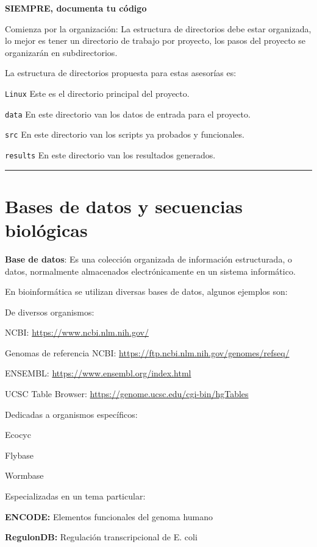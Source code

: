 \documentclass[
]{book}
\begin{document}
\textbf{SIEMPRE, documenta tu código}

Comienza por la organización: La estructura de directorios debe estar organizada, lo mejor es
tener un directorio de trabajo por proyecto, los pasos del proyecto se organizarán en
subdirectorios.

La estructura de directorios propuesta para estas asesorías es:

\texttt{Linux} Este es el directorio principal del proyecto.

\texttt{data} En este directorio van los datos de entrada para el proyecto.

\texttt{src} En este directorio van los scripts ya probados y funcionales.

\texttt{results} En este directorio van los resultados generados.

\begin{center}\rule{0.5\linewidth}{0.5pt}\end{center}

\section{Bases de datos y secuencias biológicas}\label{bases-de-datos-y-secuencias-bioluxf3gicas}

\textbf{Base de datos}: Es una colección organizada de información estructurada, o datos, normalmente
almacenados electrónicamente en un sistema informático.

En bioinformática se utilizan diversas bases de datos, algunos ejemplos son:

De diversos organismos:

NCBI: \url{https://www.ncbi.nlm.nih.gov/}

Genomas de referencia NCBI: \url{https://ftp.ncbi.nlm.nih.gov/genomes/refseq/}

ENSEMBL: \url{https://www.ensembl.org/index.html}

UCSC Table Browser: \url{https://genome.ucsc.edu/cgi-bin/hgTables}

Dedicadas a organismos específicos:

Ecocyc

Flybase

Wormbase

Especializadas en un tema particular:

\textbf{ENCODE:} Elementos funcionales del genoma humano

\textbf{RegulonDB:} Regulación transcripcional de E. coli
\end{document}
